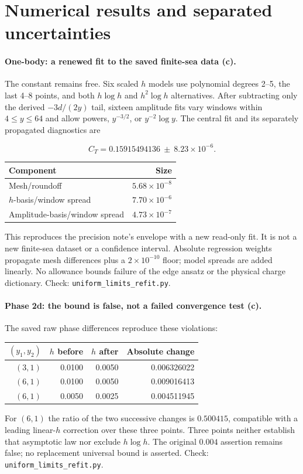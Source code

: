 \documentclass[11pt,a4paper]{article}
\newcommand{\scr}[1]{\texttt{uniform\_\allowbreak limits\_\allowbreak #1.py}}
\begin{document}
\section{Numerical results and separated uncertainties}
\paragraph{One-body: a renewed fit to the saved finite-sea data (c).}
The constant remains free. Six scaled $h$ models use polynomial degrees
2--5, the last 4--8 points, and both $h\log h$ and $h^2\log h$ alternatives.
After subtracting only the derived $-3d/(2y)$ tail, sixteen amplitude fits
vary windows within $4\leq y\leq64$ and allow powers, $y^{-3/2}$, or
$y^{-2}\log y$. The central fit and its separately propagated diagnostics are

\[C_T=0.15915494136\ \pm\ 8.23\times10^{-6}.\]
\begin{center}\begin{tabular}{lr}\toprule Component & Size\\\midrule
Mesh/roundoff & $5.68\times10^{-8}$\\
$h$-basis/window spread & $7.70\times10^{-6}$\\
Amplitude-basis/window spread & $4.73\times10^{-7}$\\
\bottomrule\end{tabular}\end{center}
This reproduces the precision note's envelope with a new read-only fit.
It is not a new finite-sea dataset or a confidence interval. Absolute
regression weights propagate mesh differences plus a $2\times10^{-10}$ floor;
model spreads are added linearly. No allowance bounds failure of the edge
ansatz or the physical charge dictionary. Check: \scr{refit}.

\paragraph{Phase 2d: the bound is false, not a failed convergence test (c).}
The saved raw phase differences reproduce these violations:
\begin{center}\begin{tabular}{rrrr}\toprule
$(y_1,y_2)$ & $h$ before & $h$ after & Absolute change\\\midrule
$(3,1)$ & 0.0100 & 0.0050 & 0.006326022\\
$(6,1)$ & 0.0100 & 0.0050 & 0.009016413\\
$(6,1)$ & 0.0050 & 0.0025 & 0.004511945\\
\bottomrule\end{tabular}\end{center}
For $(6,1)$ the ratio of the two successive changes is $0.500415$,
compatible with a leading linear-$h$ correction over these three points.
Three points neither establish that asymptotic law nor exclude $h\log h$.
The original $0.004$ assertion remains false; no replacement universal bound
is asserted. Check: \scr{refit}.
\end{document}

